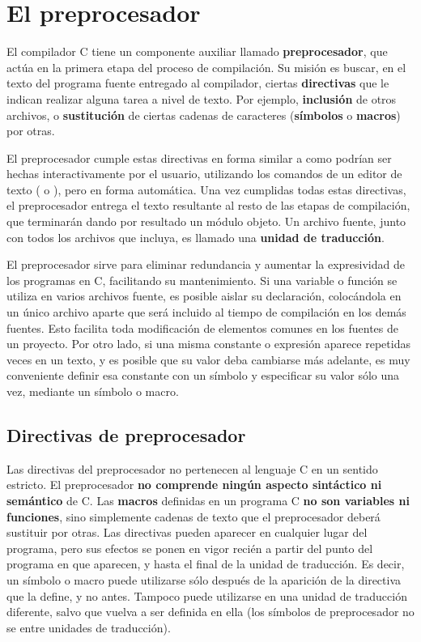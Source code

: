 
\chapter{El preprocesador}

El compilador C tiene un componente auxiliar llamado \textbf{preprocesador}, que actúa en la primera etapa del proceso de compilación. Su misión es buscar, en el texto del programa fuente entregado al compilador, ciertas \textbf{directivas} que le indican realizar alguna tarea a nivel de texto. Por ejemplo, \textbf{inclusión} de otros archivos, o \textbf{sustitución} de ciertas cadenas de caracteres (\textbf{símbolos} o \textbf{macros}) por otras. 

El preprocesador cumple estas directivas en forma similar a como podrían ser hechas interactivamente por el usuario, utilizando los comandos de un editor de texto ( o ), pero en forma automática. Una vez cumplidas todas estas directivas, el preprocesador entrega el texto resultante al resto de las etapas de compilación, que terminarán dando por resultado un módulo objeto. Un archivo fuente, junto con todos los archivos que incluya, es llamado una \textbf{unidad de traducción}.


El preprocesador sirve para eliminar redundancia y aumentar la expresividad de los programas en C, facilitando su mantenimiento. Si una variable o función se utiliza en varios archivos fuente, es posible aislar su declaración, colocándola en un único archivo aparte que será incluido al tiempo de compilación en los demás fuentes. Esto facilita toda modificación de elementos comunes en los fuentes de un proyecto. Por otro lado, si una misma constante o expresión aparece repetidas veces en un texto, y es posible que su valor deba cambiarse más adelante, es muy conveniente definir esa constante con un símbolo y especificar su valor sólo una vez, mediante un símbolo o macro.

\section{Directivas de preprocesador}

Las directivas del preprocesador no pertenecen al lenguaje C en un sentido estricto. El preprocesador \textbf{no comprende ningún aspecto sintáctico ni semántico} de C. Las \textbf{macros} definidas en un programa C \textbf{no son variables ni funciones}, sino simplemente cadenas de texto que el preprocesador deberá sustituir por otras. Las directivas pueden aparecer en cualquier lugar del programa, pero sus efectos se ponen en vigor recién a partir del punto del programa en que aparecen, y hasta el final de la unidad de traducción. Es decir, un símbolo o macro puede utilizarse sólo después de la aparición de la directiva que la define, y no antes. Tampoco puede utilizarse en una unidad de traducción diferente, salvo que vuelva a ser definida en ella (los símbolos de preprocesador no se  entre unidades de traducción).

